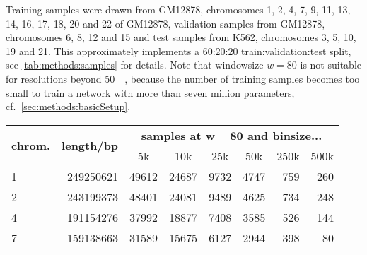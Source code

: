 Training samples were drawn from GM12878, chromosomes 1, 2, 4, 7, 9, 11, 13, 14, 16, 17, 18, 20 and 22 of GM12878, 
validation samples from GM12878, chromosomes 6, 8, 12 and 15 and test samples from K562, chromosomes 3, 5, 10, 19 and 21.
This approximately implements a 60:20:20 train:validation:test split, see \cref{tab:methods:samples} for details.
Note that windowsize $w=80$ is not suitable for resolutions beyond \SI{50}{\kilo\bp}, because the number of training samples becomes too small
to train a network with more than seven million parameters, cf.~\cref{sec:methods:basicSetup}.
\begin{table}[hbp]
\centering
\begin{tabular}{lrrrrrrr}
\hline
\multicolumn{1}{c}{\multirow{2}{*}{\textbf{chrom.}}} & \multicolumn{1}{c}{\multirow{2}{*}{\textbf{length/bp}}} & \multicolumn{6}{c}{\textbf{samples at $\mathbf{w=80}$ and binsize...}}                                                                                                \\
\multicolumn{1}{c}{}                                     & \multicolumn{1}{c}{}                                    & \multicolumn{1}{c}{5k} & \multicolumn{1}{c}{10k} & \multicolumn{1}{c}{25k} & \multicolumn{1}{c}{50k} & \multicolumn{1}{c}{250k} & \multicolumn{1}{c}{500k} \\ \hline
1                                                        & 249250621                                               & 49612                  & 24687                   & 9732                    & 4747                    & 759                      & 260                      \\
2                                                        & 243199373                                               & 48401                  & 24081                   & 9489                    & 4625                    & 734                      & 248                      \\
4                                                        & 191154276                                               & 37992                  & 18877                   & 7408                    & 3585                    & 526                      & 144                      \\
7                                                        & 159138663                                               & 31589                  & 15675                   & 6127                    & 2944                    & 398                      & 80                       \\

\end{tabular}
\end{table}
